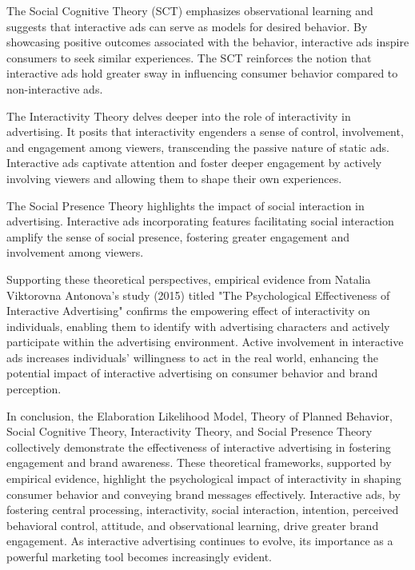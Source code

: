 \documentclass[journal]{IEEEtran}
\begin{document}
The Social Cognitive Theory (SCT) emphasizes observational learning and suggests that interactive ads can
serve as models for desired behavior\cite{bandura1986social}. By showcasing positive outcomes associated with the
behavior, interactive ads inspire consumers to seek similar experiences. The SCT reinforces the notion that
interactive ads hold greater sway in influencing consumer behavior compared to non-interactive ads.

The Interactivity Theory delves deeper into the role of interactivity in advertising\cite{liu2002interactivity}.
It posits that interactivity engenders a sense of control, involvement, and engagement among viewers,
transcending the passive nature of static ads. Interactive ads captivate attention and foster deeper
engagement by actively involving viewers and allowing them to shape their own experiences.

The Social Presence Theory highlights the impact of social interaction in advertising\cite{short1976social}.
Interactive ads incorporating features facilitating social interaction amplify the sense of social presence, fostering greater
engagement and involvement among viewers.

Supporting these theoretical perspectives, empirical evidence from Natalia Viktorovna Antonova's study (2015) titled
"The Psychological Effectiveness of Interactive Advertising"\cite{antonova2015psychological} confirms the empowering effect of interactivity
on individuals, enabling them to identify with advertising characters and actively participate within
the advertising environment. Active involvement in interactive ads increases individuals'
willingness to act in the real world, enhancing the potential impact of interactive
advertising on consumer behavior and brand perception.

In conclusion, the Elaboration Likelihood Model, Theory of Planned Behavior, Social Cognitive Theory,
Interactivity Theory, and Social Presence Theory collectively demonstrate the effectiveness of interactive
advertising in fostering engagement and brand awareness. These theoretical frameworks, supported by empirical
evidence, highlight the psychological impact of interactivity in shaping consumer behavior and conveying
brand messages effectively. Interactive ads, by fostering central processing, interactivity, social
interaction, intention, perceived behavioral control, attitude, and observational learning,
drive greater brand engagement. As interactive advertising continues to evolve, its importance
as a powerful marketing tool becomes increasingly evident.
\end{document}
